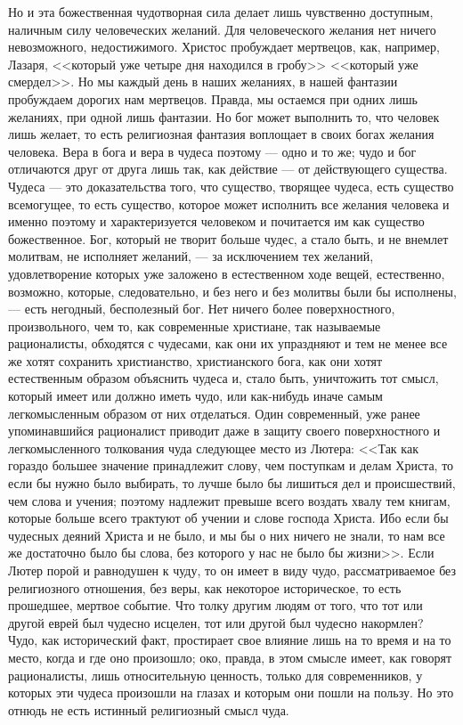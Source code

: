 \documentclass[12pt]{article}
\begin{document}
Но и эта божественная чудотворная сила делает лишь чувственно доступным, наличным силу человеческих желаний. Для человеческого желания нет ничего невозможного, недостижимого. Христос пробуждает мертвецов, как, например, Лазаря, <<который уже четыре дня находился в гробу>>  <<который уже смердел>>. Но мы каждый день в наших желаниях, в нашей фантазии пробуждаем дорогих нам мертвецов. Правда, мы остаемся при одних лишь желаниях, при одной лишь фантазии. Но бог может выполнить то, что человек лишь желает, то есть религиозная фантазия воплощает в своих богах желания человека. Вера в бога и вера в чудеса поэтому --- одно и то же; чудо и бог отличаются друг от друга лишь так, как действие --- от действующего существа. Чудеса --- это доказательства того, что существо, творящее чудеса, есть существо всемогущее, то есть существо, которое может исполнить все желания человека и именно поэтому и характеризуется человеком и почитается им как существо божественное. Бог, который не творит больше чудес, а стало быть, и не внемлет молитвам, не исполняет желаний, --- за исключением тех желаний, удовлетворение которых уже заложено в естественном ходе вещей, естественно, возможно, которые, следовательно, и без него и без молитвы были бы исполнены, --- есть негодный, бесполезный бог. Нет ничего более поверхностного, произвольного, чем то, как современные христиане, так называемые рационалисты, обходятся с чудесами, как они их упраздняют и тем не менее все же хотят сохранить христианство, христианского бога, как они хотят естественным образом объяснить чудеса и, стало быть, уничтожить тот смысл, который имеет или должно иметь чудо, или как-нибудь иначе самым легкомысленным образом от них отделаться. Один современный, уже ранее упоминавшийся рационалист приводит даже в защиту своего поверхностного и легкомысленного толкования чуда следующее место из Лютера: <<Так как гораздо большее значение принадлежит слову, чем поступкам и делам Христа, то если бы нужно было выбирать, то лучше было бы лишиться дел и происшествий, чем слова и учения; поэтому надлежит превыше всего воздать хвалу тем книгам, которые больше всего трактуют об учении и слове господа Христа. Ибо если бы чудесных деяний Христа и не было, и мы бы о них ничего не знали, то нам все же достаточно было бы слова, без которого у нас не было бы жизни>>. Если Лютер порой и равнодушен к чуду, то он имеет в виду чудо, рассматриваемое без религиозного отношения, без веры, как некоторое историческое, то есть прошедшее, мертвое событие. Что толку другим людям от того, что тот или другой еврей был чудесно исцелен, тот или другой был чудесно накормлен? Чудо, как исторический факт, простирает свое влияние лишь на то время и на то место, когда и где оно произошло; око, правда, в этом смысле имеет, как говорят рационалисты, лишь относительную ценность, только для современников, у которых эти чудеса произошли на глазах и которым они пошли на пользу. Но это отнюдь не есть истинный религиозный смысл чуда. 
\end{document}
